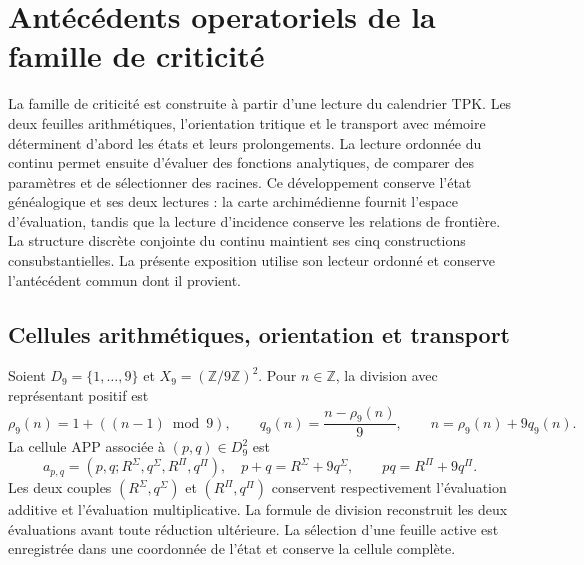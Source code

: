 \providecommand{\ZZ}{\mathbb Z}
\providecommand{\RR}{\mathbb R}
\providecommand{\FF}{\mathbb F}
\providecommand{\APP}{\mathrm{APP}}
\providecommand{\TPK}{\mathrm{TPK}}
\providecommand{\TRIT}{\{-1,0,+1\}}

\section{Antécédents operatoriels de la famille de criticité}
\label{hmtfg:antecedentes-operatorios}

La famille de criticité est construite à partir d’une lecture du calendrier TPK. Les deux feuilles arithmétiques, l’orientation tritique et le transport avec mémoire déterminent d’abord les états et leurs prolongements. La lecture ordonnée du continu permet ensuite d’évaluer des fonctions analytiques, de comparer des paramètres et de sélectionner des racines. Ce développement conserve l’état généalogique et ses deux lectures : la carte archimédienne fournit l’espace d’évaluation, tandis que la lecture d’incidence conserve les relations de frontière. La structure discrète conjointe du continu maintient ses cinq constructions consubstantielles. La présente exposition utilise son lecteur ordonné et conserve l’antécédent commun dont il provient.

\subsection{Cellules arithmétiques, orientation et transport}
\label{hmtfg:app-trit-transporte}

Soient \(D_9=\{1,\ldots,9\}\) et \(X_9=(\ZZ/9\ZZ)^2\). Pour
\(n\in\ZZ\), la division avec représentant positif est
\[
 \rho_9(n)=1+((n-1)\bmod9),\qquad
 q_9(n)=\frac{n-\rho_9(n)}9,\qquad
 n=\rho_9(n)+9q_9(n).
\]
La cellule APP associée à \((p,q)\in D_9^2\) est
\[
 a_{p,q}=(p,q;R^\Sigma,q^\Sigma,R^\Pi,q^\Pi),
 \quad
 p+q=R^\Sigma+9q^\Sigma,\qquad
 pq=R^\Pi+9q^\Pi.
\]
Les deux couples \((R^\Sigma,q^\Sigma)\) et \((R^\Pi,q^\Pi)\) conservent respectivement l’évaluation additive et l’évaluation multiplicative. La formule de division reconstruit les deux évaluations avant toute réduction ultérieure. La sélection d’une feuille active est enregistrée dans une coordonnée de l’état et conserve la cellule complète.

